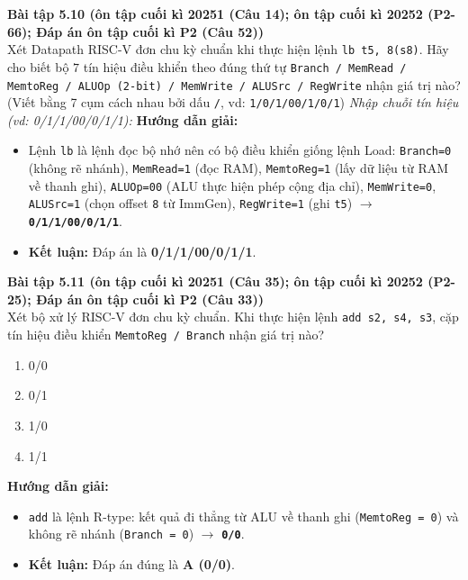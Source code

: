 \textbf{Bài tập 5.10 (ôn tập cuối kì 20251 (Câu 14); ôn tập cuối kì 20252 (P2-66); Đáp án ôn tập cuối kì P2 (Câu 52))}\\
Xét Datapath RISC-V đơn chu kỳ chuẩn khi thực hiện lệnh \texttt{lb t5, 8(s8)}. Hãy cho biết bộ $7$ tín hiệu điều khiển theo đúng thứ tự \texttt{Branch / MemRead / MemtoReg / ALUOp (2-bit) / MemWrite / ALUSrc / RegWrite} nhận giá trị nào? (Viết bằng 7 cụm cách nhau bởi dấu \texttt{/}, vd: \texttt{1/0/1/00/1/0/1})
\textit{Nhập chuỗi tín hiệu (vd: 0/1/1/00/0/1/1):}
\textbf{Hướng dẫn giải:}
\begin{itemize}
    \item Lệnh \texttt{lb} là lệnh đọc bộ nhớ nên có bộ điều khiển giống lệnh Load: \texttt{Branch=0} (không rẽ nhánh), \texttt{MemRead=1} (đọc RAM), \texttt{MemtoReg=1} (lấy dữ liệu từ RAM về thanh ghi), \texttt{ALUOp=00} (ALU thực hiện phép cộng địa chỉ), \texttt{MemWrite=0}, \texttt{ALUSrc=1} (chọn offset \texttt{8} từ ImmGen), \texttt{RegWrite=1} (ghi \texttt{t5}) $\rightarrow$ \textbf{\texttt{0/1/1/00/0/1/1}}.
    \item \textbf{Kết luận:} Đáp án là \textbf{0/1/1/00/0/1/1}.
\end{itemize}

\textbf{Bài tập 5.11 (ôn tập cuối kì 20251 (Câu 35); ôn tập cuối kì 20252 (P2-25); Đáp án ôn tập cuối kì P2 (Câu 33))}\\
Xét bộ xử lý RISC-V đơn chu kỳ chuẩn. Khi thực hiện lệnh \texttt{add s2, s4, s3}, cặp tín hiệu điều khiển \texttt{MemtoReg / Branch} nhận giá trị nào?
\begin{enumerate}[label=\Alph*.]
    \item 0/0
    \item 0/1
    \item 1/0
    \item 1/1
\end{enumerate}
\textbf{Hướng dẫn giải:}
\begin{itemize}
    \item \texttt{add} là lệnh R-type: kết quả đi thẳng từ ALU về thanh ghi (\texttt{MemtoReg = 0}) và không rẽ nhánh (\texttt{Branch = 0}) $\rightarrow$ \textbf{\texttt{0/0}}.
    \item \textbf{Kết luận:} Đáp án đúng là \textbf{A (0/0)}.
\end{itemize}

